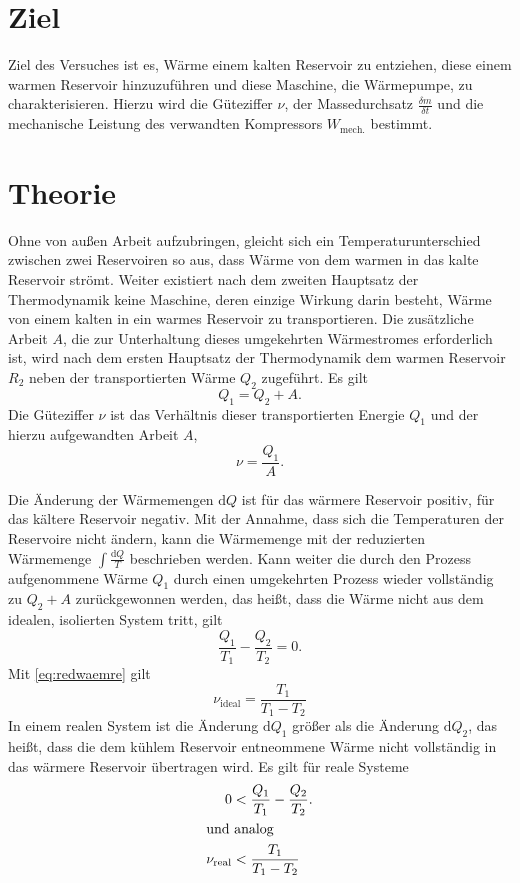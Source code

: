 \section{Ziel}
\label{sec:Ziel}
Ziel des Versuches ist es, Wärme einem kalten Reservoir zu entziehen, diese einem warmen Reservoir hinzuzuführen und diese Maschine, die Wärmepumpe, zu charakterisieren.
Hierzu wird die Güteziffer $\nu$, der Massedurchsatz $\frac{\delta{m}}{\delta{t}}$ und die mechanische Leistung des verwandten Kompressors $W_\text{mech.}$ bestimmt.
\section{Theorie}
\label{sec:Theorie}
Ohne von außen Arbeit aufzubringen, gleicht sich ein Temperaturunterschied zwischen zwei Reservoiren so aus, 
dass Wärme von dem warmen in das kalte Reservoir strömt.
Weiter existiert nach dem zweiten Hauptsatz der Thermodynamik keine Maschine, deren einzige Wirkung darin besteht, Wärme von einem kalten in ein warmes Reservoir zu transportieren\cite{hauptsaetzederthermodynamik}.
Die zusätzliche Arbeit $A$, die zur Unterhaltung dieses umgekehrten Wärmestromes erforderlich ist, wird nach dem ersten Hauptsatz der Thermodynamik dem warmen Reservoir $R_2$ neben der transportierten Wärme $Q_2$ %
zugeführt.
Es gilt\\
\begin{equation}
	Q_1 = Q_2+A.
	\label{eq:waermetransport}
\end{equation}
Die Güteziffer $\nu$ ist das Verhältnis dieser transportierten Energie $Q_1$ und der hierzu aufgewandten Arbeit $A$,
\begin{equation}
	\nu = \frac{Q_1}{A}.
	\label{eq:gueteziffer}
\end{equation}

\noindent Die Änderung der Wärmemengen $\mathup{d}Q$ ist für das wärmere Reservoir positiv, für das kältere Reservoir negativ.
Mit der Annahme, dass sich die Temperaturen der Reservoire nicht ändern, kann die Wärmemenge mit der reduzierten Wärmemenge $\int \frac{\mathup{d}Q}{T}$ beschrieben werden. 
Kann weiter die durch den Prozess aufgenommene Wärme $Q_1$ durch einen umgekehrten Prozess wieder vollständig zu $Q_2 + A$ zurückgewonnen werden, das heißt, dass die Wärme nicht aus dem idealen, isolierten System tritt, gilt
\begin{equation}
	\frac{Q_1}{T_1}-\frac{Q_2}{T_2} = 0.
\label{eq:redwaemre}
\end{equation}
Mit \eqref{eq:redwaemre} gilt 
\begin{equation}
	\nu_{\text{ideal}} = \frac{T_1}{T_1-T_2}
\label{eq:nu_ideal}
\end{equation}
In einem realen System ist die Änderung $\mathup{d}Q_1$ größer als die Änderung $\mathup{d}Q_2$, das heißt, dass die dem kühlem Reservoir entneommene Wärme nicht vollständig in das wärmere Reservoir übertragen wird.
Es gilt für reale Systeme
\begin{align}
	 0 &< \frac{Q_1}{T_1}-\frac{Q_2}{T_2}.\\
	\intertext{und analog}
	\nu_{\text{real}} &< \frac{T_1}{T_1-T_2}
\end{align}
